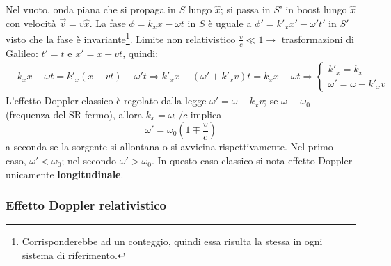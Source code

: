 \documentclass[10pt, a4paper]{scrartcl}
\numberwithin{equation}{subsection}
\theoremstyle{style1}
\begin{document}
Nel vuoto, onda piana che si propaga in $S$ lungo $\hat{x}$; si passa in $S$' in boost lungo $\hat{x}$ con velocit\`a $\vec{v}= v \hat{x}$. La fase $\phi =k_x x - \omega t$ in $S$ \`e uguale a $\phi ' = k'_x x' - \omega' t'$ in $S'$ visto che la fase \`e invariante\footnote{Corrisponderebbe ad un conteggio, quindi essa risulta la stessa in ogni sistema di riferimento.}. Limite non relativistico $\frac{v}{c}\ll 1 \to$ trasformazioni di Galileo: $t' = t$ e $x' = x-vt$, quindi:
\[
\begin{split}
	&k_x x - \omega t = k'_x(x-vt) - \omega 't \Rightarrow k'_x x - (\omega' + k'_x v ) t = k_x x - \omega t \Rightarrow \begin{cases}
		k'_x = k_x\\
		\omega' = \omega- k'_x v
	\end{cases}
\end{split}
\] 
L'effetto Doppler classico \`e regolato dalla legge $\omega'=\omega-k_x v$; se $\omega\equiv \omega_0$ (frequenza del SR fermo), allora $k_x = \omega_0 / c$ implica
\begin{equation}
	\omega'=\omega_0 \left(1 \mp \frac{v}{c}\right) 
\end{equation}
a seconda se la sorgente si allontana o si avvicina rispettivamente. Nel primo caso, $\omega' < \omega_0$; nel secondo $\omega' > \omega_0$. In questo caso classico si nota effetto Doppler unicamente \textbf{longitudinale}.

\subsubsection{Effetto Doppler relativistico}
\end{document}
